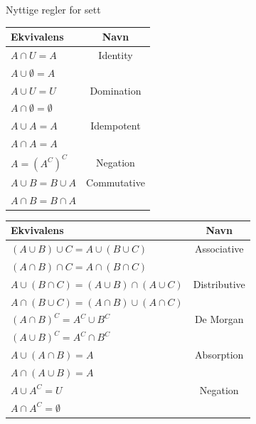 \begin{frame}{Nyttige regler for sett}
        \begin{tabular}{l|c}
        Ekvivalens & Navn \\ \hline
        $A \cap U = A$ & Identity\\
        $A \cup \emptyset = A$ \\ \hline
        
        $A \cup U = U$ & Domination\\
        $A \cap \emptyset = \emptyset$\\ \hline
        
        $A \cup A = A$ & Idempotent\\
        $A \cap A = A$ \\ \hline
        
        $A = (A^C)^C$ & Negation\\ \hline
        
        $A \cup B = B \cup A$ & Commutative\\
        $A \cap B = B \cap A$ \\

    \end{tabular}
    \hfill
        \begin{tabular}{l|c}
        Ekvivalens & Navn \\ \hline
        
        $(A \cup B) \cup C = A \cup (B \cup C)$ & Associative\\
        $(A \cap B) \cap C = A \cap (B \cap C)$ \\ \hline
        
        $A \cup (B \cap C) = (A \cup B) \cap (A \cup C)$ & Distributive\\
        $A \cap (B \cup C) = (A \cap B) \cup (A \cap C)$ \\ \hline
        
        $(A \cap B)^C = A^C \cup B^C$ & De Morgan \\
        $(A \cup B)^C = A^C \cap B^C$ \\ \hline
        
        $A \cup (A \cap B) = A$ & Absorption \\
        $A \cap (A \cup B) = A$ \\ \hline
        
        $A \cup A^C = U$ & Negation \\
        $A \cap A^C = \emptyset$ \\
        \end{tabular}
\end{frame}

